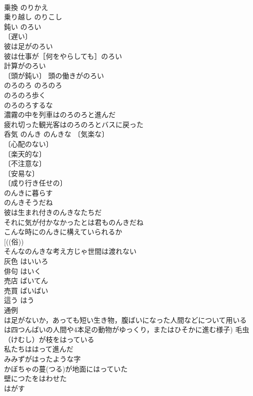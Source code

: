 \documentclass[8pt]{extreport}
\begin{document}
\begin{CJK}{UTF8}{min}
\\	乗換	のりかえ	
\\	乗り越し	のりこし	
\\	鈍い	のろい	
\\	〔遅い〕
\\	彼は足がのろい 
\\	彼は仕事が［何をやらしても］のろい 
\\	計算がのろい 
\\	〔頭が鈍い〕 頭の働きがのろい 
\\	のろのろ	のろのろ	
\\	のろのろ歩く 
\\	のろのろするな 
\\	濃霧の中を列車はのろのろと進んだ 
\\	疲れ切った観光客はのろのろとバスに戻った 
\\	呑気	のんき	のんきな 〔気楽な〕
\\	〔心配のない〕
\\	〔楽天的な〕
\\	〔不注意な〕
\\	〔安易な〕
\\	〔成り行き任せの〕
\\	のんきに暮らす 
\\	のんきそうだね 
\\	彼は生まれ付きのんきなたちだ 
\\	それに気が付かなかったとは君ものんきだね 
\\	こんな時にのんきに構えていられるか 
\\	[((俗))
\\	そんなのんきな考え方じゃ世間は渡れない 
\\	灰色	はいいろ	
\\	俳句	はいく	
\\	売店	ばいてん	
\\	売買	ばいばい	
\\	這う	はう	
\\	通例
\\	は足がないか，あっても短い生き物，腹ばいになった人間などについて用いる
\\	は四つんばいの人間や4本足の動物がゆっくり，またはひそかに進む様子) 毛虫（けむし）が枝をはっている 
\\	私たちははって進んだ 
\\	みみずがはったような字 
\\	かぼちゃの蔓(つる)が地面にはっていた 
\\	壁につたをはわせた 
\\	はがす	

\end{CJK}
\end{document}
